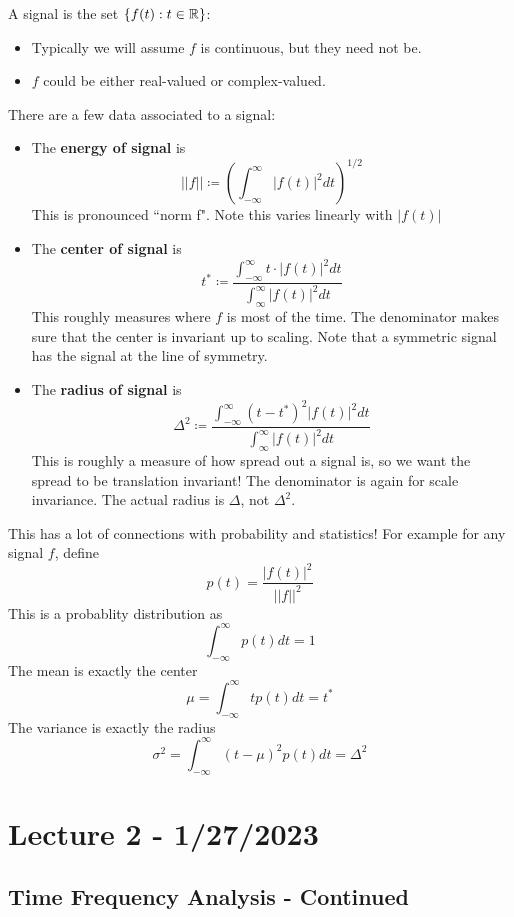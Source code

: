 \documentclass{article}
\begin{document}
\begin{definition}
A signal is the set $\{f(t): t \in \mathbb{R}\}$:
\begin{itemize}
    \item Typically we will assume $f$ is continuous, but they need not be.
    \item $f$ could be either real-valued or complex-valued.
\end{itemize}
There are a few data associated to a signal:
\begin{itemize}
    \item The \textbf{energy of signal} is $$||f|| \coloneqq (\int_{-\infty}^\infty |f(t)|^2 dt)^{1/2}$$ This is pronounced ``norm f". Note this varies linearly with $|f(t)|$
    \item The \textbf{center of signal} is $$t^* \coloneqq \frac{\int_{-\infty}^\infty t \cdot |f(t)|^2 dt}{\int_{\infty}^{\infty} |f(t)|^2 dt}$$ This roughly measures where $f$ is most of the time. The denominator makes sure that the center is invariant up to scaling. Note that a symmetric signal has the signal at the line of symmetry.
    \item The \textbf{radius of signal} is $$\Delta^2 \coloneqq \frac{\int_{-\infty}^\infty (t - t^*)^2 |f(t)|^2 dt}{\int_{\infty}^{\infty} |f(t)|^2 dt}$$  This is roughly a measure of how spread out a signal is, so we want the spread to be translation invariant! The denominator is again for scale invariance. The actual radius is $\Delta$, not $\Delta^2$.
\end{itemize}
\end{definition}

\begin{remark}
This has a lot of connections with probability and statistics! For example for any signal $f$, define
\[p(t) = \frac{|f(t)|^2}{||f||^2}\]
This is a probablity distribution as
\[\int_{-\infty}^\infty p(t) dt = 1\]
The mean is exactly the center
\[\mu = \int_{-\infty}^\infty t p(t) dt = t^*\]
The variance is exactly the radius
\[\sigma^2 = \int_{-\infty}^\infty (t - \mu)^2 p(t) dt = \Delta^2\]
\end{remark}

\newpage
\section{Lecture 2 - 1/27/2023}

\subsection{Time Frequency Analysis - Continued}
\end{document}

